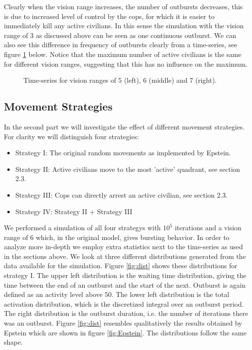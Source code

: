 \documentclass[11pt,a4paper,onecolumn]{article}
\begin{document}
Clearly when the vision range increases, the number of outbursts decreases, this is due to increased level of control by the cops, for which it is easier to immediately kill any active civilians. In this sense the simulation with the vision range of 3 as discussed above can be seen as one continuous outburst. We can also see this difference in frequency of outbursts clearly from a time-series, see figure \ref{fig:originals} below. Notice that the maximum number of active civilians is the same for different vision ranges, suggesting that this has no influence on the maximum.

\begin{figure}[H]
  \centering
  \caption{Time-series for vision ranges of 5 (left), 6 (middle) and 7 (right).}
  \label{fig:originals}
\end{figure}

\subsection{Movement Strategies}
In the second part we will investigate the effect of different movement strategies. For clarity we will distinguish four strategies:

\begin{itemize}
\item
  Strategy I: The original random movements as implemented by Epstein.
\item
  Strategy II: Active civilians move to the most 'active' quadrant, see section 2.3.
\item
  Strategy III: Cops can directly arrest an active civilian, see section 2.3.
\item
  Strategy IV: Strategy II + Strategy III
\end{itemize}

We performed a simulation of all four strategys with $10^5$ iterations and a vision range of 6 which, in the original model, gives bursting behavior. In order to analyze more in-depth we employ extra statistics next to the time-series as used in the sections above. We look at three different distributions generated from the data available for the simulation. Figure \ref{fig:dist} shows these distributions for strategy I. The upper left distribution is the waiting time distribution, giving the time between the end of an outburst and the start of the next. Outburst is again defined as an activity level above 50. The lower left distribution is the total activation distribution, which is the discretized integral over an outburst period. The right distribution is the outburst duration, i.e. the number of iterations there was an outburst. Figure \ref{fig:dist} resembles qualitatively the results obtained by Epstein which are shown in figure \ref{fig:Epstein}. The distributions follow the same shape.
\end{document}
